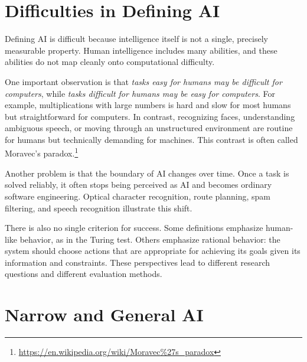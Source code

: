 \documentclass[11pt,openany,oneside]{book}
\begin{document}


\section{Difficulties in Defining AI}

Defining AI is difficult because intelligence itself is not a single, precisely
measurable property. Human intelligence includes many abilities, and these
abilities do not map cleanly onto computational difficulty.

One important observation is that \emph{tasks easy for humans may be difficult for
computers}, while \emph{tasks difficult for humans may be easy for computers}. For
example, multiplications with large numbers is hard and slow for most humans but
straightforward for computers. In contrast, recognizing faces, understanding
ambiguous speech, or moving through an unstructured environment are routine for
humans but technically demanding for machines. This contrast is often called
Moravec's paradox.\footnote{\url{https://en.wikipedia.org/wiki/Moravec\%27s_paradox}}


Another problem is that the boundary of AI changes over time. Once a task is
solved reliably, it often stops being perceived as AI and becomes ordinary
software engineering. Optical character recognition, route planning, spam
filtering, and speech recognition illustrate this shift.

There is also no single criterion for success. Some definitions emphasize
human-like behavior, as in the Turing test. Others emphasize rational behavior:
the system should choose actions that are appropriate for achieving its goals
given its information and constraints. These perspectives lead to different
research questions and different evaluation methods.

\section{Narrow and General AI}
\end{document}
